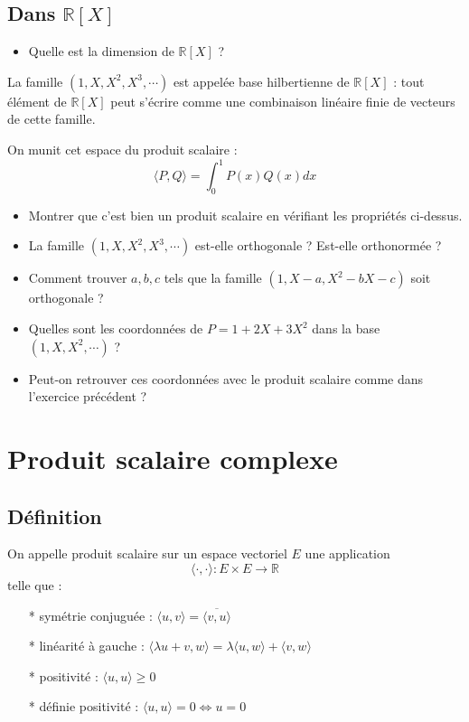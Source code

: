 \vspace{1em}

\subsection{Dans $\mathbb{R}[X]$}

\begin{itemize}
    \item Quelle est la dimension de $\mathbb{R}[X]$ ?
\end{itemize}
La famille $(1,X,X^2,X^3, \cdots )$ est appelée base hilbertienne de $\mathbb{R}[X]$ : tout élément de $\mathbb{R}[X]$ peut s'écrire comme une combinaison linéaire finie de vecteurs de cette famille.

On munit cet espace du produit scalaire : 
$$ \langle P, Q \rangle = \int_{0}^{1} P(x) Q(x) dx $$

\begin{itemize}
    \item Montrer que c'est bien un produit scalaire en vérifiant les propriétés ci-dessus.
    \item La famille $(1,X,X^2,X^3, \cdots )$ est-elle orthogonale ? Est-elle orthonormée ?
    \item Comment trouver $a, b, c$ tels que la famille $(1, X-a, X^2-bX-c)$ soit orthogonale ?
    \item Quelles sont les coordonnées de $P = 1+2X+3X^2$ dans la base $(1, X, X^2, \cdots)$ ?
    \item Peut-on retrouver ces coordonnées avec le produit scalaire comme dans l'exercice précédent ?
\end{itemize}
\vspace{1em}

\section*{Produit scalaire complexe}
\subsection{Définition}
On appelle produit scalaire sur un espace vectoriel $E$ une application 
$$\langle \cdot, \cdot \rangle : E \times E \to \mathbb{R}$$
telle que :
\begin{multicols}{2}
\begin{itemize}
    \item[*] symétrie conjuguée : $\langle u, v \rangle = \overline{\langle v, u \rangle}$
    \item[*] linéarité à gauche : $\langle \lambda u + v, w \rangle = \lambda \langle u, w \rangle + \langle v, w \rangle$
    \item[*] positivité : $\langle u, u \rangle \geq 0$
    \item[*] définie positivité : $\langle u, u \rangle = 0 \iff u = 0$
\end{itemize}
\end{multicols}


